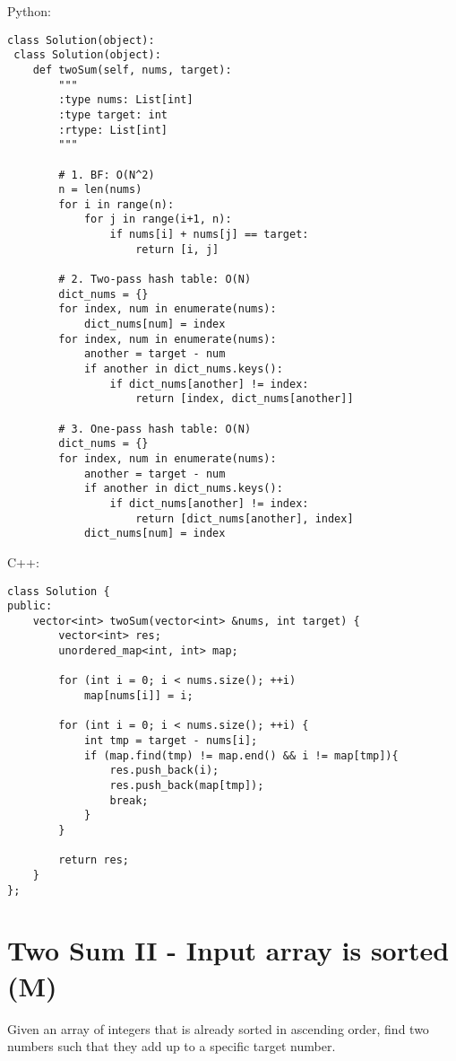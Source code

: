 Python:
\lstset{language=python}
\begin{lstlisting}
class Solution(object):
 class Solution(object):
    def twoSum(self, nums, target):
        """
        :type nums: List[int]
        :type target: int
        :rtype: List[int]
        """
        
        # 1. BF: O(N^2)
        n = len(nums)
        for i in range(n):
            for j in range(i+1, n):
                if nums[i] + nums[j] == target:
                    return [i, j]
        
        # 2. Two-pass hash table: O(N)
        dict_nums = {}
        for index, num in enumerate(nums):
            dict_nums[num] = index
        for index, num in enumerate(nums):
            another = target - num
            if another in dict_nums.keys():
                if dict_nums[another] != index:
                    return [index, dict_nums[another]]
            
        # 3. One-pass hash table: O(N)
        dict_nums = {}
        for index, num in enumerate(nums):
            another = target - num
            if another in dict_nums.keys():
                if dict_nums[another] != index:
                    return [dict_nums[another], index]
            dict_nums[num] = index
\end{lstlisting}


C++:
\lstset{language=C++}
\begin{lstlisting}
class Solution {
public:
    vector<int> twoSum(vector<int> &nums, int target) {
        vector<int> res;
        unordered_map<int, int> map;
        
        for (int i = 0; i < nums.size(); ++i)
            map[nums[i]] = i;
            
        for (int i = 0; i < nums.size(); ++i) {
            int tmp = target - nums[i];
            if (map.find(tmp) != map.end() && i != map[tmp]){
                res.push_back(i);
                res.push_back(map[tmp]);
                break;
            }
        }
        
        return res;
    }
};
\end{lstlisting}


\section{Two Sum II - Input array is sorted (M)}
Given an array of integers that is already sorted in ascending order, find two numbers such that they add up to a specific target number.\\

